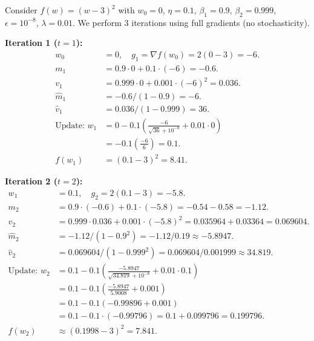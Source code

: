\documentclass{article}
\theoremstyle{plain}
\theoremstyle{definition}
\begin{document}
Consider $f(w) = (w - 3)^2$ with $w_0 = 0$, $\eta = 0.1$, $\beta_1 = 0.9$, $\beta_2 = 0.999$, $\epsilon = 10^{-8}$, $\lambda = 0.01$. We perform 3 iterations using full gradients (no stochasticity).

\textbf{Iteration 1 ($t=1$):}
\begin{align*}
    w_0 &= 0, \quad g_1 = \nabla f(w_0) = 2(0-3) = -6. \\
    m_1 &= 0.9 \cdot 0 + 0.1 \cdot (-6) = -0.6. \\
    v_1 &= 0.999 \cdot 0 + 0.001 \cdot (-6)^2 = 0.036. \\
    \hat{m}_1 &= -0.6 / (1 - 0.9) = -6. \\
    \hat{v}_1 &= 0.036 / (1 - 0.999) = 36. \\
    \text{Update: } w_1 &= 0 - 0.1 \left( \frac{-6}{\sqrt{36} + 10^{-8}} + 0.01 \cdot 0 \right) \\
    &= -0.1 \left( \frac{-6}{6} \right) = 0.1. \\
    f(w_1) &= (0.1 - 3)^2 = 8.41.
\end{align*}

\textbf{Iteration 2 ($t=2$):}
\begin{align*}
    w_1 &= 0.1, \quad g_2 = 2(0.1 - 3) = -5.8. \\
    m_2 &= 0.9 \cdot (-0.6) + 0.1 \cdot (-5.8) = -0.54 - 0.58 = -1.12. \\
    v_2 &= 0.999 \cdot 0.036 + 0.001 \cdot (-5.8)^2 = 0.035964 + 0.03364 = 0.069604. \\
    \hat{m}_2 &= -1.12 / (1 - 0.9^2) = -1.12 / 0.19 \approx -5.8947. \\
    \hat{v}_2 &= 0.069604 / (1 - 0.999^2) = 0.069604 / 0.001999 \approx 34.819. \\
    \text{Update: } w_2 &= 0.1 - 0.1 \left( \frac{-5.8947}{\sqrt{34.819} + 10^{-8}} + 0.01 \cdot 0.1 \right) \\
    &= 0.1 - 0.1 \left( \frac{-5.8947}{5.9008} + 0.001 \right) \\
    &= 0.1 - 0.1 \left( -0.99896 + 0.001 \right) \\
    &= 0.1 - 0.1 \cdot (-0.99796) = 0.1 + 0.099796 = 0.199796. \\
    f(w_2) &\approx (0.1998 - 3)^2 = 7.841.
\end{align*}
\end{document}
